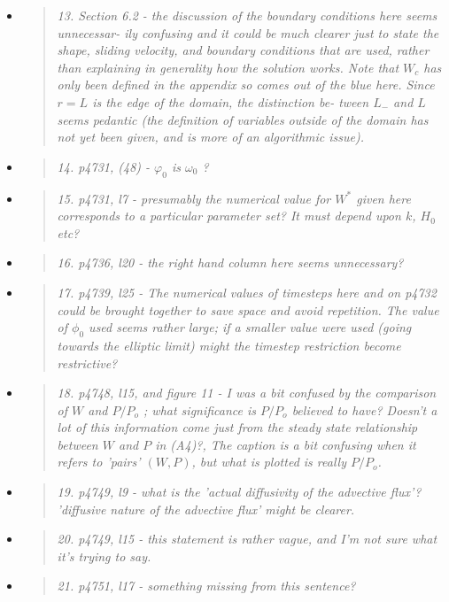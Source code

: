 \documentclass[11pt,reqno]{amsart}
\newcommand{\reply}[2]{
\medskip\medskip
\item  \begin{quote}
\emph{#1}
\end{quote}

\medskip
\noindent #2}
\begin{document}
\begin{itemize}
\reply{13. Section 6.2 - the discussion of the boundary conditions here seems unnecessar-
ily confusing and it could be much clearer just to state the shape, sliding velocity,
and boundary conditions that are used, rather than explaining in generality how
the solution works. Note that $W_c$ has only been defined in the appendix so comes
out of the blue here. Since $r = L$ is the edge of the domain, the distinction be-
tween $L_-$ and $L$ seems pedantic (the definition of variables outside of the domain
has not yet been given, and is more of an algorithmic issue).}
{}

\reply{14. p4731, (48) - $\varphi_0$ is $\omega_0$ ?}
{}

\reply{15. p4731, l7 - presumably the numerical value for $W^*$ given here corresponds to a
particular parameter set? It must depend upon $k$, $H_0$ etc?}
{}

\reply{16. p4736, l20 - the right hand column here seems unnecessary?}
{}

\reply{17. p4739, l25 - The numerical values of timesteps here and on p4732 could be
brought together to save space and avoid repetition. The value of $\phi_0$ used seems
rather large; if a smaller value were used (going towards the elliptic limit) might
the timestep restriction become restrictive?}
{}

\reply{18. p4748, l15, and figure 11 - I was a bit confused by the comparison of $W$ and $P/P_o$ ;
what significance is $P/P_o$ believed to have? Doesn't a lot of this information come
just from the steady state relationship between $W$ and $P$ in (A4)?, The caption is
a bit confusing when it refers to 'pairs' $(W,P)$, but what is plotted is really $P/P_o$.}
{}

\reply{19. p4749, l9 - what is the 'actual diffusivity of the advective flux'?  'diffusive nature of
the advective flux' might be clearer.}
{}

\reply{20. p4749, l15 - this statement is rather vague, and I'm not sure what it's trying to
say.}
{}

\reply{21. p4751, l17 - something missing from this sentence?}
{}
\end{itemize}
\end{document}
